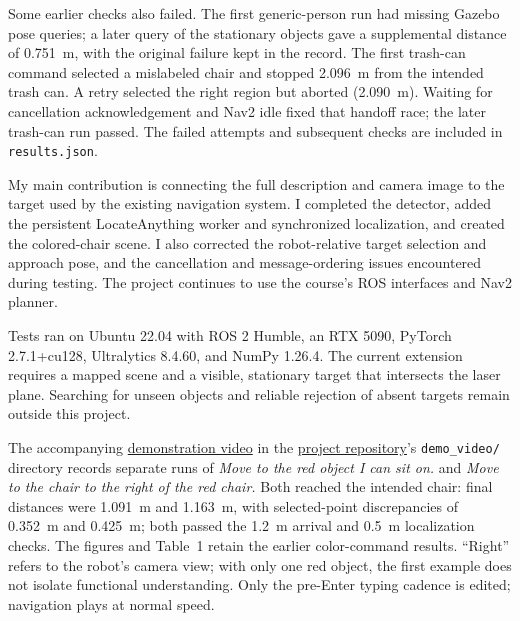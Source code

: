 \documentclass[10pt,letterpaper]{article}
\newcommand{\code}[1]{\texttt{#1}}
\begin{document}
Some earlier checks also failed. The first generic-person run had missing Gazebo pose queries; a later query of the stationary objects gave a supplemental distance of 0.751~m, with the original failure kept in the record. The first trash-can command selected a mislabeled chair and stopped 2.096~m from the intended trash can. A retry selected the right region but aborted (2.090~m). Waiting for cancellation acknowledgement and Nav2 idle fixed that handoff race; the later trash-can run passed. The failed attempts and subsequent checks are included in \code{results.json}.

My main contribution is connecting the full description and camera image to the target used by the existing navigation system. I completed the detector, added the persistent LocateAnything worker and synchronized localization, and created the colored-chair scene. I also corrected the robot-relative target selection and approach pose, and the cancellation and message-ordering issues encountered during testing. The project continues to use the course's ROS interfaces and Nav2 planner.

Tests ran on Ubuntu 22.04 with ROS 2 Humble, an RTX 5090, PyTorch 2.7.1+cu128, Ultralytics 8.4.60, and NumPy 1.26.4. The current extension requires a mapped scene and a visible, stationary target that intersects the laser plane. Searching for unseen objects and reliable rejection of absent targets remain outside this project.

The accompanying \href{https://github.com/lllingshen/project3a/blob/main/demo_video/project3_demo.mp4}{demonstration video} in the \href{https://github.com/lllingshen/project3a}{project repository}'s \code{demo\_video/} directory records separate runs of \emph{Move to the red object I can sit on.} and \emph{Move to the chair to the right of the red chair.} Both reached the intended chair: final distances were 1.091~m and 1.163~m, with selected-point discrepancies of 0.352~m and 0.425~m; both passed the 1.2~m arrival and 0.5~m localization checks. The figures and Table~1 retain the earlier color-command results. ``Right'' refers to the robot's camera view; with only one red object, the first example does not isolate functional understanding. Only the pre-Enter typing cadence is edited; navigation plays at normal speed.
\end{document}
